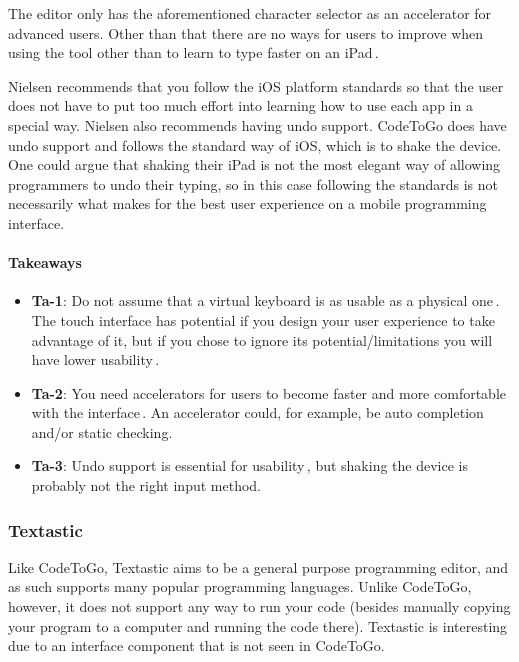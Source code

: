 The editor only has the aforementioned character selector as an accelerator for advanced users. Other than that there are no ways for users to improve when using the tool other than to learn to type faster on an iPad\,\cite{nielsen1990heuristic}.

Nielsen recommends that you follow the iOS platform standards so that the user does not have to put too much effort into learning how to use each app in a special way. Nielsen also recommends having undo support. CodeToGo does have undo support and follows the standard way of iOS, which is to shake the device. One could argue that shaking their iPad is not the most elegant way of allowing programmers to undo their typing, so in this case following the standards is not necessarily what makes for the best user experience on a mobile programming interface.

\paragraph{Takeaways}
\begin{itemize}
	\item \textbf{Ta-1}: Do not assume that a virtual keyboard is as usable as a physical one\,\cite{nielsen2013mobile}. The touch interface has potential if you design your user experience to take advantage of it, but if you chose to ignore its potential/limitations you will have lower usability\,\cite{nielsen1990heuristic}.
	\item \textbf{Ta-2}: You need accelerators for users to become faster and more comfortable with the interface\,\cite{nielsen1990heuristic}. An accelerator could, for example, be auto completion and/or static checking.
	\item \textbf{Ta-3}: Undo support is essential for usability\,\cite{nielsen1990heuristic}, but shaking the device is probably not the right input method.
\end{itemize}

\subsubsection{Textastic}
\label{subsub:Textastic}
Like CodeToGo, Textastic aims to be a general purpose programming editor, and as such supports many popular programming languages. Unlike CodeToGo, however, it does not support any way to run your code (besides manually copying your program to a computer and running the code there). Textastic is interesting due to an interface component that is not seen in CodeToGo.

